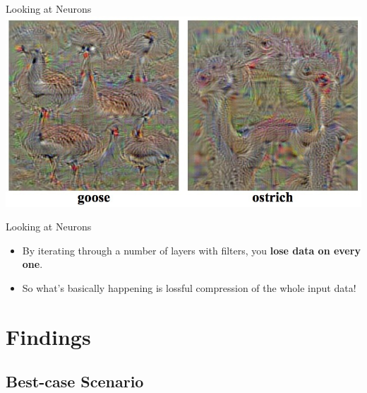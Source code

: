 \documentclass{beamer}
\begin{document}
\begin{frame}{Looking at Neurons}
\centering
  \includegraphics[scale=0.7]{deepvis_goose_ostrich.jpg}
  \cite{DeepVis}
\end{frame}

\begin{frame}{Looking at Neurons}
  \begin{itemize}
  \item {
    By iterating through a number of layers with filters, you \textbf{lose data on every one}.
  }
  \item {
    So what's basically happening is \alert{lossful compression} of the whole input data!
  }
  \end{itemize}
\end{frame}


\section{Findings}


\subsection{Best-case Scenario}
\end{document}
